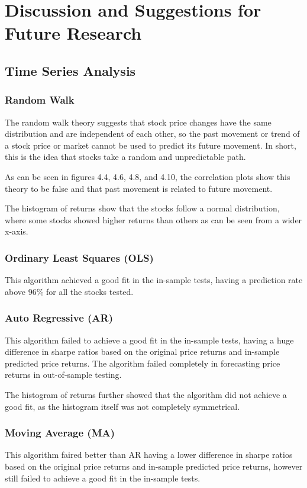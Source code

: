 \chapter{Discussion and Suggestions for Future Research}

\section{Time Series Analysis}

\subsection{Random Walk}
The random walk theory suggests that stock price changes have the same distribution and are independent of each other, so the past movement or trend of a stock price or market cannot be used to predict its future movement. In short, this is the idea that stocks take a random and unpredictable path.

As can be seen in figures 4.4, 4.6, 4.8, and 4.10, the correlation plots show this theory to be false and that past movement is related to future movement.

The histogram of returns show that the stocks follow a normal distribution, where some stocks showed higher returns than others as can be seen from a wider x-axis.

\subsection{Ordinary Least Squares (OLS)}
This algorithm achieved a good fit in the in-sample tests, having a prediction rate above 96\% for all the stocks tested.

\subsection{Auto Regressive (AR)}
This algorithm failed to achieve a good fit in the in-sample tests, having a huge difference in sharpe ratios based on the original price returns and in-sample predicted price returns. The algorithm failed completely in forecasting price returns in out-of-sample testing. 

The histogram of returns further showed that the algorithm did not achieve a good fit, as the histogram itself was not completely symmetrical.

\subsection{Moving Average (MA)}
This algorithm faired better than AR having a lower difference in sharpe ratios based on the original price returns and in-sample predicted price returns, however still failed to achieve a good fit in the in-sample tests.


